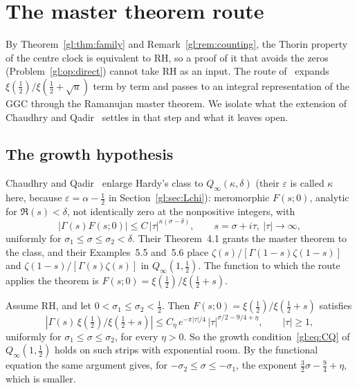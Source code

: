 \section{The master theorem route}\label{gl:sec:rmt}

By Theorem~\ref{gl:thm:family} and Remark~\ref{gl:rem:counting}, the Thorin property of the centre clock is equivalent to RH, so a proof of it that avoids the zeros (Problem~\ref{gl:op:direct}) cannot take RH as an input. The route of~\cite{P17} expands $\xi(\tfrac12)/\xi(\tfrac12+\sqrt u)$ term by term and passes to an integral representation of the GGC through the Ramanujan master theorem. We isolate what the extension of Chaudhry and Qadir~\cite{ChaudhryQadir12} settles in that step and what it leaves open.

\subsection{The growth hypothesis}

Chaudhry and Qadir~\cite[\S4]{ChaudhryQadir12} enlarge Hardy's class to $Q_\infty(\kappa,\delta)$ (their $\varepsilon$ is called $\kappa$ here, because $\varepsilon=\alpha-\tfrac12$ in Section~\ref{gl:sec:Lchi}): meromorphic $F(s;0)$, analytic for $\Re(s)<\delta$, not identically zero at the nonpositive integers, with
\begin{equation}\label{gl:eq:CQ}
|\Gamma(s)F(s;0)| \le C\,|\tau|^{\kappa(\sigma-\delta)},\qquad s=\sigma+i\tau,\ |\tau|\to\infty,
\end{equation}
uniformly for $\sigma_1\le\sigma\le\sigma_2<\delta$. Their Theorem~4.1 grants the master theorem to the class, and their Examples~5.5 and~5.6 place $\zeta(s)/[\Gamma(1-s)\zeta(1-s)]$ and $\zeta(1-s)/[\Gamma(s)\zeta(s)]$ in $Q_\infty(1,\tfrac12)$. The function to which the route applies the theorem is $F(s;0)=\xi(\tfrac12)/\xi(\tfrac12+s)$.

\begin{lemma}\label{gl:lem:stirling}
Assume RH, and let $0<\sigma_1\le\sigma_2<\tfrac12$. Then $F(s;0)=\xi(\tfrac12)/\xi(\tfrac12+s)$ satisfies
\[
|\Gamma(s)\,\xi(\tfrac12)/\xi(\tfrac12+s)| \le C_\eta\,e^{-\pi|\tau|/4}\,|\tau|^{\sigma/2-9/4+\eta},\qquad |\tau|\ge1,
\]
uniformly for $\sigma_1\le\sigma\le\sigma_2$, for every $\eta>0$. So the growth condition~\eqref{gl:eq:CQ} of $Q_\infty(1,\tfrac12)$ holds on such strips with exponential room. By the functional equation the same argument gives, for $-\sigma_2\le\sigma\le-\sigma_1$, the exponent $\tfrac32\sigma-\tfrac94+\eta$, which is smaller.
\end{lemma}

